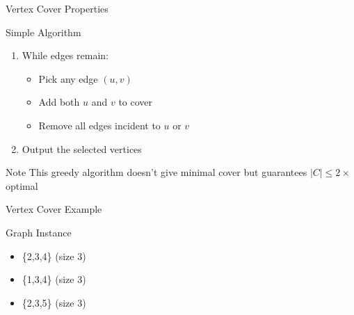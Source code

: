 \documentclass{beamer}
\begin{document}
\begin{frame}{Vertex Cover Properties}
    \begin{exampleblock}{Simple Algorithm}
        \begin{enumerate}
            \item While edges remain:
            \begin{itemize}
                \item Pick any edge $(u,v)$
                \item Add both $u$ and $v$ to cover
                \item Remove all edges incident to $u$ or $v$
            \end{itemize}
            \item Output the selected vertices
        \end{enumerate}
    \end{exampleblock}
    
    \begin{alertblock}{Note}
        This greedy algorithm doesn't give minimal cover but guarantees $|C| \leq 2 \times$ optimal
    \end{alertblock}
\end{frame}

\begin{frame}{Vertex Cover Example}
            \begin{block}{Graph Instance}
            \centering
                \begin{itemize}
                    \item \textcolor{myred}{\{2,3,4\}} (size 3)
                    \item \{1,3,4\} (size 3)
                    \item \{2,3,5\} (size 3)
                \end{itemize}
            \end{block}
            
\end{frame}
\end{document}
